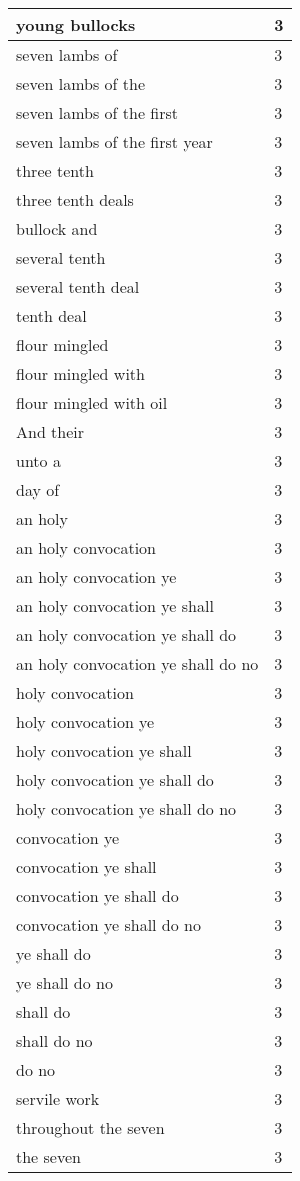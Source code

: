 \begin{center}
\begin{longtable}{|p{3.0in}|p{0.5in}|}
young bullocks & 3\\ \hline 
seven lambs of & 3\\ \hline 
seven lambs of the & 3\\ \hline 
seven lambs of the first & 3\\ \hline 
seven lambs of the first year & 3\\ \hline 
three tenth & 3\\ \hline 
three tenth deals & 3\\ \hline 
bullock and & 3\\ \hline 
several tenth & 3\\ \hline 
several tenth deal & 3\\ \hline 
tenth deal & 3\\ \hline 
flour mingled & 3\\ \hline 
flour mingled with & 3\\ \hline 
flour mingled with oil & 3\\ \hline 
And their & 3\\ \hline 
unto a & 3\\ \hline 
day of & 3\\ \hline 
an holy & 3\\ \hline 
an holy convocation & 3\\ \hline 
an holy convocation ye & 3\\ \hline 
an holy convocation ye shall & 3\\ \hline 
an holy convocation ye shall do & 3\\ \hline 
an holy convocation ye shall do no & 3\\ \hline 
holy convocation & 3\\ \hline 
holy convocation ye & 3\\ \hline 
holy convocation ye shall & 3\\ \hline 
holy convocation ye shall do & 3\\ \hline 
holy convocation ye shall do no & 3\\ \hline 
convocation ye & 3\\ \hline 
convocation ye shall & 3\\ \hline 
convocation ye shall do & 3\\ \hline 
convocation ye shall do no & 3\\ \hline 
ye shall do & 3\\ \hline 
ye shall do no & 3\\ \hline 
shall do & 3\\ \hline 
shall do no & 3\\ \hline 
do no & 3\\ \hline 
servile work & 3\\ \hline 
throughout the seven & 3\\ \hline 
the seven & 3\\ \hline 
\end{longtable}
\end{center}





